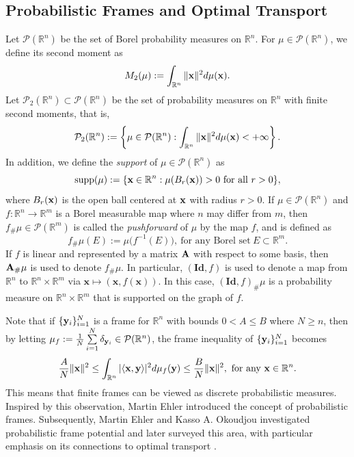 \documentclass{amsart}
\numberwithin{equation}{section}
\DeclareMathOperator{\supp}{supp}
\theoremstyle{plain}
\theoremstyle{definition}
\begin{document}
\subsection{Probabilistic Frames and Optimal Transport}
Let $\mathcal{P}(\mathbb{R}^n)$ be the set of Borel probability measures on $\mathbb{R}^n$. For $\mu \in \mathcal{P}(\mathbb{R}^n)$, we define its second moment as 
$$M_2(\mu) := \int_{\mathbb{R}^n} \Vert {\bf x} \Vert ^2 d\mu({\bf x}).$$
Let
$\mathcal{P}_2(\mathbb{R}^n) \subset \mathcal{P}(\mathbb{R}^n)$ be the set of probability measures on $\mathbb{R}^n$ with finite second moments, that is, 
\begin{equation*}
\mathcal{P}_2(\mathbb{R}^n) := \left \{ \mu \in \mathcal{P}(\mathbb{R}^n):  \int_{\mathbb{R}^n} \Vert {\bf x} \Vert ^2 d\mu({\bf x}) < + \infty \right \}.
\end{equation*}
In addition, we define the \textit{support} of $\mu \in  \mathcal{P}(\mathbb{R}^n)$ as 
$$\supp(\mu) := \{ {\bf x} \in \mathbb{R}^n: \mu(B_r({\bf x}))>0 \ \text{for all} \ r>0 \},$$
where $B_r({\bf x})$ is the open ball centered at ${\bf x}$ with radius $r>0$.
If $\mu \in  \mathcal{P}(\mathbb{R}^n) $ and $f: \mathbb{R}^n \rightarrow \mathbb{R}^m$ is a Borel measurable map where $n$ may differ from $m$, then $f_{\#} \mu \in \mathcal{P}(\mathbb{R}^m)$ is called the \textit{pushforward} of $\mu$ by the map $f$,  and is defined as
$$f_{\#} \mu (E) := \mu \big (f^{-1}(E) \big ), \ \text{for any Borel set}  \ E \subset \mathbb{R}^m.$$ If $f$ is linear and represented by a matrix ${\bf A}$ with respect to some basis, then ${\bf A}_{\#} \mu$ is used to denote $f_{\#} \mu$. In particular, $(\mathbf{Id}, f)$ is used to denote a map from $\mathbb{R}^n$ to $\mathbb{R}^n \times \mathbb{R}^m$ via $\mathbf{x} \mapsto (\mathbf{x}, f(\mathbf{x}))$. In this case, $(\mathbf{Id}, f)_\#\mu$ is a probability measure on $\mathbb{R}^n \times \mathbb{R}^m$ that is supported on the graph of $f$.


Note that if $\{{\bf y}_i\}_{i=1}^N$ is a frame for $\mathbb{R}^n$ with bounds $0<A \leq B$ where $N \geq n$, then by letting $\mu_f := \frac{1}{N} \sum\limits_{i=1}^N  \delta_{{\bf y}_i} \in \mathcal{P}(\mathbb{R}^n)$, the frame inequality of $\{{\bf y}_i\}_{i=1}^N$ becomes
\begin{equation*}
    \frac{A}{N} \Vert {\bf x}  \Vert^2 \leq\int_{\mathbb{R}^n} \vert \langle {\bf x},{\bf y} \rangle \vert ^2 d\mu_f({\bf y})  \leq \frac{B}{N} \Vert {\bf x}  \Vert^2, \ \text{for any} \ {\bf x} \in \mathbb{R}^n.
\end{equation*}
This means that finite frames can be viewed as discrete probabilistic measures. 
Inspired by this observation, Martin Ehler \cite{ehler2012random} introduced the concept of probabilistic frames.
Subsequently, Martin Ehler and Kasso A. Okoudjou investigated probabilistic frame potential \cite{ehler2012minimization} and later surveyed this area,  with particular emphasis on its connections to optimal transport \cite{ehler2013probabilistic}.
\end{document}
